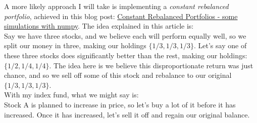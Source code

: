 \documentclass{article}
\begin{document}
A more likely approach I will take is implementing a \textit{constant rebalanced portfolio}, achieved in this blog post: \href{https://www.chrisstucchio.com/blog/2015/constant_rebalanced_portfolios.html}{Constant Rebalanced Portfolios - some simulations with numpy}. The idea explained in this article is: \\

Say we have three stocks, and we believe each will perform equally well, so we split our money in three, making our holdings $\{1/3, 1/3, 1/3\}$. Let's say one of these three stocks does significantly better than the rest, making our holdings: $\{1/2, 1/4, 1/4\}$. The idea here is we believe this disproportionate return was just chance, and so we sell off some of this stock and rebalance to our original $\{1/3, 1/3, 1/3\}$. \\

With my index fund, what we might say is: \\

Stock A is planned to increase in price, so let's buy a lot of it before it has increased. Once it has increased, let's sell it off and regain our original balance.
\end{document}
